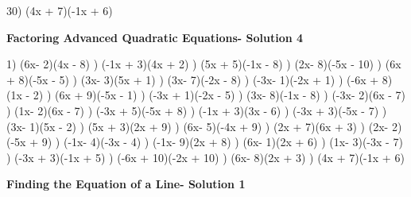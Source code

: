 \documentclass{article}%
\begin{document}
30) (4x + 7)(-1x + 6)%
\newline%
\newpage%
\large%
\begin{center}%
\textbf{Factoring Advanced Quadratic Equations- Solution 4}%
\newline%
\end{center} \normalsize%
1) (6x- 2)(4x - 8)%
) (-1x + 3)(4x + 2)%
) (5x + 5)(-1x - 8)%
) (2x- 8)(-5x - 10)%
) (6x + 8)(-5x - 5)%
) (3x- 3)(5x + 1)%
) (3x- 7)(-2x - 8)%
) (-3x- 1)(-2x + 1)%
) (-6x + 8)(1x - 2)%
) (6x + 9)(-5x - 1)%
) (-3x + 1)(-2x - 5)%
) (3x- 8)(-1x - 8)%
) (-3x- 2)(6x - 7)%
) (1x- 2)(6x - 7)%
) (-3x + 5)(-5x + 8)%
) (-1x + 3)(3x - 6)%
) (-3x + 3)(-5x - 7)%
) (3x- 1)(5x - 2)%
) (5x + 3)(2x + 9)%
) (6x- 5)(-4x + 9)%
) (2x + 7)(6x + 3)%
) (2x- 2)(-5x + 9)%
) (-1x- 4)(-3x - 4)%
) (-1x- 9)(2x + 8)%
) (6x- 1)(2x + 6)%
) (1x- 3)(-3x - 7)%
) (-3x + 3)(-1x + 5)%
) (-6x + 10)(-2x + 10)%
) (6x- 8)(2x + 3)%
) (4x + 7)(-1x + 6)%
\newline%
\newpage%
\large%
\begin{center}%
\textbf{Finding the Equation of a Line- Solution 1}%
\newline%
\end{center} \normalsize%
\end{document}
